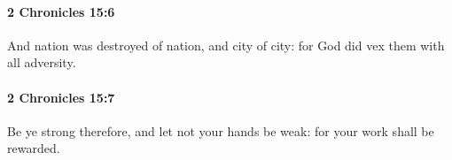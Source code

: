 		\paragraph{2 Chronicles 15:6} %
			\label{2CHRONICLES-15-6}

			And nation was destroyed of nation, and city of city: for God did vex them with all adversity.


		\paragraph{2 Chronicles 15:7} %
			\label{2CHRONICLES-15-7}

			Be ye strong therefore, and let not your hands be weak: for your work shall be rewarded.


